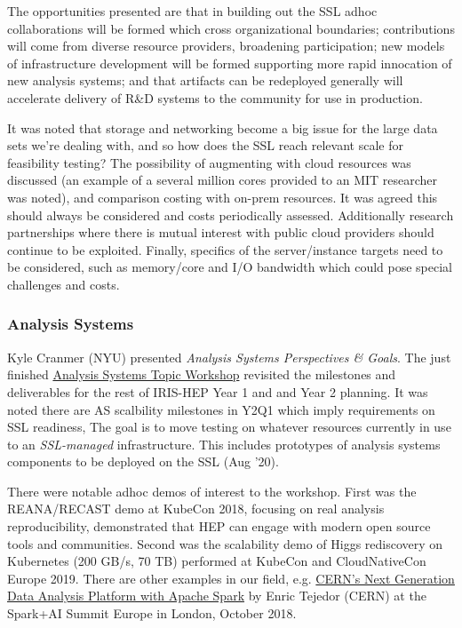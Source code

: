 \documentclass[11pt,letterpaper,fleqn]{article}
\begin{document}
The opportunities presented are that in building out the SSL adhoc collaborations will be formed which cross organizational boundaries; contributions will come from diverse resource providers, broadening participation; new models of infrastructure development will be formed supporting more rapid innocation of new analysis systems; and that artifacts can be redeployed generally will accelerate delivery of R\&D systems to the community for use in production.

It was noted that storage and networking become a big issue for the large data sets we’re dealing with, and so how does the SSL reach relevant scale for feasibility testing?  The possibility of augmenting with cloud resources was discussed (an example of a several million cores provided to an MIT researcher was noted), and comparison costing with on-prem resources.  It was agreed this should always be considered and costs periodically assessed.  Additionally research partnerships where there is mutual interest with public cloud providers should continue to be exploited.   Finally, specifics of the server/instance targets need to be considered, such as memory/core and I/O bandwidth which could pose special challenges and costs.


\subsubsection{Analysis Systems}
Kyle Cranmer (NYU) presented {\it Analysis Systems Perspectives \& Goals}.  The just finished \href{https://indico.cern.ch/event/822074/}{Analysis Systems Topic Workshop} revisited the milestones and deliverables for the rest of IRIS-HEP Year 1 and and Year 2 planning.  It was noted there are AS scalbility milestones in Y2Q1 which imply requirements on SSL readiness,  The goal is to move testing on whatever resources currently in use to an {\it SSL-managed} infrastructure.
This includes prototypes of analysis systems components to be deployed on the SSL (Aug '20).

There were notable adhoc demos of interest to the workshop. First was the REANA/RECAST demo at KubeCon 2018, focusing on real analysis reproducibility, demonstrated that HEP can engage with modern open source tools and communities.  Second was the scalability demo of Higgs rediscovery on Kubernetes (200 GB/s, 70 TB) performed at KubeCon and CloudNativeCon Europe 2019.  There are other examples in our field, e.g. \href{https://www.youtube.com/watch?v=Ye8MlJQumaI}{CERN’s Next Generation Data Analysis Platform with Apache Spark} by Enric Tejedor (CERN) at the Spark+AI Summit Europe in London, October 2018.
\end{document}
